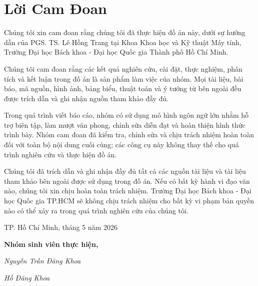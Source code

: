 \newpage

\section*{\Huge Lời Cam Đoan}

Chúng tôi xin cam đoan rằng chúng tôi đã thực hiện đồ án này, dưới sự hướng dẫn của PGS. TS. Lê Hồng Trang tại Khoa Khoa học và Kỹ thuật Máy tính, Trường Đại học Bách khoa - Đại học Quốc gia Thành phố Hồ Chí Minh.

Chúng tôi cam đoan rằng các kết quả nghiên cứu, cài đặt, thực nghiệm, phân tích và kết luận trong đồ án là sản phẩm làm việc của nhóm. Mọi tài liệu, bài báo, mã nguồn, hình ảnh, bảng biểu, thuật toán và ý tưởng từ bên ngoài đều được trích dẫn và ghi nhận nguồn tham khảo đầy đủ.

Trong quá trình viết báo cáo, nhóm có sử dụng mô hình ngôn ngữ lớn nhằm hỗ trợ biên tập, làm mượt văn phong, chỉnh sửa diễn đạt và hoàn thiện hình thức trình bày. Nhóm cam đoan đã kiểm tra, chỉnh sửa và chịu trách nhiệm hoàn toàn đối với toàn bộ nội dung cuối cùng; các công cụ này không thay thế cho quá trình nghiên cứu và thực hiện đồ án.

Chúng tôi đã trích dẫn và ghi nhận đầy đủ tất cả các nguồn tài liệu và tài liệu tham khảo bên ngoài được sử dụng trong đồ án. Nếu có bất kỳ hành vi đạo văn nào, chúng tôi xin chịu hoàn toàn trách nhiệm. Trường Đại học Bách khoa - Đại học Quốc gia TP.HCM sẽ không chịu trách nhiệm cho bất kỳ vi phạm bản quyền nào có thể xảy ra trong quá trình nghiên cứu của chúng tôi.

\begin{flushright}
\begin{minipage}[t]{0.55\textwidth}
\begin{center}
    TP. Hồ Chí Minh, tháng 5 năm 2026
    
    \textbf{Nhóm sinh viên thực hiện,}

    \textit{Nguyễn Trần Đăng Khoa}

    \textit{Hồ Đăng Khoa}
    \end{center}
\end{minipage}
\end{flushright}
\begin{flushright}
    
\end{flushright}